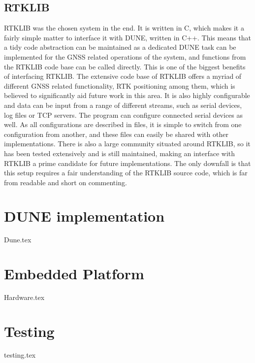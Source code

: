     \subsection{RTKLIB}
    RTKLIB was the chosen system in the end. It is written in C, which makes it a fairly simple matter to interface it with DUNE, written in C++. This means that a tidy code abstraction can be maintained as a dedicated DUNE task can be implemented for the GNSS related operations of the system, and functions from the RTKLIB code base can be called directly. This is one of the biggest benefits of interfacing RTKLIB. The extensive code base of RTKLIB offers a myriad of different GNSS related functionality, RTK positioning among them, which is believed to significantly aid future work in this area. It is also highly configurable and data can be input from a range of different streams, such as serial devices, log files or TCP servers. The program can configure connected serial devices as well. As all configurations are described in files, it is simple to switch from one configuration from another, and these files can easily be shared with other implementations. There is also a large community situated around RTKLIB, so it has been tested extensively and is still maintained, making an interface with RTKLIB a prime candidate for future implementations. The only downfall is that this setup requires a fair understanding of the RTKLIB source code, which is far from readable and short on commenting.
    
\section{DUNE implementation}
    {Dune.tex}
    
\section{Embedded Platform}
    {Hardware.tex}

\section{Testing}
    {testing.tex}
        


%           
        
